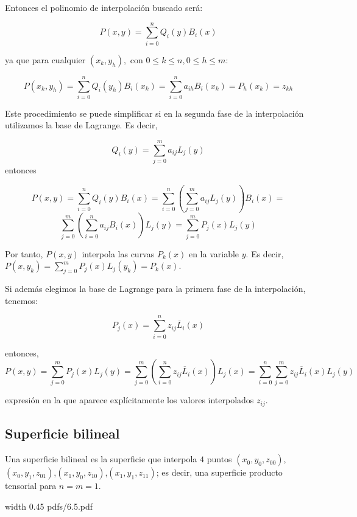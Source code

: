 \documentclass[twoside]{report}
\newcommand{\colocapdf}[2]{\quad\pdfimage width #2 {pdfs/#1.pdf}}
\begin{document}
Entonces el polinomio de interpolación buscado será:

$$P(x,y)=\sum_{i=0}^n Q_i(y) B_i(x)$$

ya que para cualquier $(x_k,y_h),$ con $0\leq k\leq n, 0\leq h\leq m$:

$$P(x_k,y_h)=\sum_{i=0}^n Q_i(y_h)B_i(x_k)=\sum_{i=0}^n a_{ih} B_i(x_k)=P_h(x_k)=z_{kh}$$

%

Este procedimiento se puede simplificar si en la segunda fase de la interpolación utilizamos la base de Lagrange. Es decir,

$$Q_i(y)=\sum_{j=0}^m a_{ij} L_j(y)$$
entonces

$$P(x,y)=\sum_{i=0}^n Q_i(y) B_i(x)=\sum_{i=0}^n \left( \sum_{j=0}^m a_{ij} L_j(y)\right) B_i(x)=$$ $$\sum_{j=0}^m \left( \sum_{i=0}^n a_{ij} B_i(x)\right) L_j(y)= \sum_{j=0}^m P_j(x)L_j(y)$$

Por tanto, $P(x,y)$ interpola las curvas $P_k(x)$ en la variable $y$. Es decir, $P(x,y_k)=\sum_{j=0}^m P_j(x)L_j(y_k)= P_k(x)$.

Si además elegimos la base de Lagrange para la primera fase de la interpolación, tenemos:

$$P_j(x)=\sum_{i=0}^n z_{ij} \overline{L}_i(x)$$

entonces,
$$P(x,y)=\sum_{j=0}^m P_j(x) L_j(y)=\sum_{j=0}^m \left( \sum_{i=0}^n z_{ij} \overline{L}_i(x)\right) L_j(x)=\sum_{i=0}^n \sum_{j=0}^m z_{ij} \overline{L}_i(x) L_j(y)$$

expresión en la que aparece explícitamente los valores interpolados $z_{ij}$.

\subsection{Superficie bilineal}

\begin{defi}
Una superficie bilineal es la superficie que interpola $4$ puntos $(x_0,y_0,z_{00})$,\;$(x_0,y_1,z_{01})$,\;$(x_1,y_0,z_{10})$,\;$(x_1,y_1,z_{11})$; es decir, una superficie producto tensorial para $n=m=1$.
\end{defi}

\begin{center}
\colocapdf{6.5}{0.45\textwidth}
\end{center}
\end{document}
